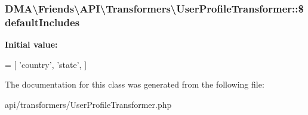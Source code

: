 \subsubsection[{\$default\+Includes}]{\setlength{\rightskip}{0pt plus 5cm}D\+M\+A\textbackslash{}\+Friends\textbackslash{}\+A\+P\+I\textbackslash{}\+Transformers\textbackslash{}\+User\+Profile\+Transformer\+::\$default\+Includes\hspace{0.3cm}{\ttfamily [protected]}}\label{classDMA_1_1Friends_1_1API_1_1Transformers_1_1UserProfileTransformer_abdc182c7aa0635a6fd2c00c7b6c57982}
{\bfseries Initial value\+:}
\begin{DoxyCode}
= [
            \textcolor{stringliteral}{'country'},
            \textcolor{stringliteral}{'state'},
    ]
\end{DoxyCode}


The documentation for this class was generated from the following file\+:\begin{DoxyCompactItemize}
\item 
api/transformers/User\+Profile\+Transformer.\+php\end{DoxyCompactItemize}
